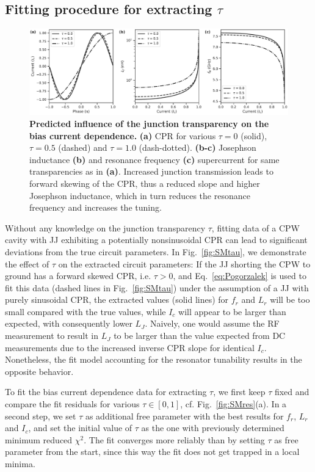 \subsection{Fitting procedure for extracting $\tau$}

\begin{figure}
	\centering
	\includegraphics[width=\linewidth]{chapter-gJJ-CPR/figs/SMFigure-influence}
	\caption{
		\textbf{Predicted influence of the junction transparency on the bias current dependence.}
		\textbf{(a)} CPR for various $\tau=0$ (solid), $\tau=0.5$ (dashed) and $\tau=1.0$	(dash-dotted).
		\textbf{(b-c)} Josephson inductance \textbf{(b)} and resonance frequency \textbf{(c)} supercurrent for	same transparencies as in \textbf{(a)}.
		Increased junction transmission leads to forward skewing of the CPR, thus a reduced slope and higher Josephson inductance, which in turn reduces the resonance frequency and increases the tuning.
	}
	\label{fig:SMinfluence}
\end{figure}

Without any knowledge on the junction transparency $\tau$, fitting data of a CPW cavity with JJ exhibiting a potentially nonsinusoidal CPR can lead to significant deviations from the true circuit parameters.
%
In Fig.~\ref{fig:SMtau}, we demonstrate the effect of $\tau$ on the extracted circuit parameters:
%
If the JJ shorting the CPW to ground has a forward skewed CPR, i.e. $\tau>0$, and Eq.~\ref{eq:Pogorzalek} is used to fit this data (dashed lines in Fig.~\ref{fig:SMtau}) under the assumption of a JJ with purely sinusoidal CPR, the extracted values (solid lines) for $f_r$ and $L_r$ will be too small compared with the true values, while $I_c$ will appear to be larger than expected, with consequently lower $L_J$.
%
Naively, one would assume the RF measurement to result in $L_J$ to be larger than the value expected from DC measurements due to the increased inverse CPR slope for identical $I_c$.
%
Nonetheless, the fit model accounting for the resonator tunability results in the opposite behavior.

To fit the bias current dependence data for extracting $\tau$, we first keep $\tau$ fixed and compare the fit residuals for various $\tau\in[0,1]$, cf. Fig.~\ref{fig:SMres}(a).
%
In a second step, we set $\tau$ as additional free parameter with the best results for $f_r$, $L_r$ and $I_c$, and set the initial value of $\tau$ as the one with previously determined minimum reduced $\chi^2$.
%
The fit converges more reliably than by setting $\tau$ as free parameter from the start, since this way the fit does not get trapped in a local minima.

